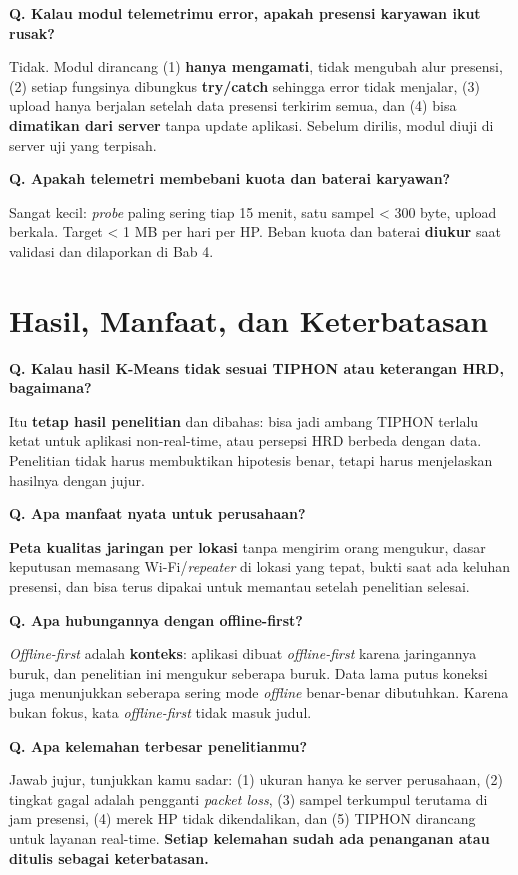 \documentclass[11pt,a4paper]{article}
\newcounter{q}
\newcommand{\tanya}[2]{\stepcounter{q}%
\par\vspace{6pt}\noindent\colorbox{band}{\parbox{\dimexpr\linewidth-2\fboxsep}{\textbf{Q\arabic{q}. #1}}}\par\vspace{2pt}#2\par}
\begin{document}
\tanya{Kalau modul telemetrimu error, apakah presensi karyawan ikut rusak?}{Tidak. Modul dirancang (1) \textbf{hanya mengamati}, tidak mengubah alur presensi, (2) setiap fungsinya dibungkus \textbf{try/catch} sehingga error tidak menjalar, (3) upload hanya berjalan setelah data presensi terkirim semua, dan (4) bisa \textbf{dimatikan dari server} tanpa update aplikasi. Sebelum dirilis, modul diuji di server uji yang terpisah.}

\tanya{Apakah telemetri membebani kuota dan baterai karyawan?}{Sangat kecil: \textit{probe} paling sering tiap 15 menit, satu sampel < 300 byte, upload berkala. Target < 1 MB per hari per HP. Beban kuota dan baterai \textbf{diukur} saat validasi dan dilaporkan di Bab 4.}

\section{Hasil, Manfaat, dan Keterbatasan}

\tanya{Kalau hasil K-Means tidak sesuai TIPHON atau keterangan HRD, bagaimana?}{Itu \textbf{tetap hasil penelitian} dan dibahas: bisa jadi ambang TIPHON terlalu ketat untuk aplikasi non-real-time, atau persepsi HRD berbeda dengan data. Penelitian tidak harus membuktikan hipotesis benar, tetapi harus menjelaskan hasilnya dengan jujur.}

\tanya{Apa manfaat nyata untuk perusahaan?}{\textbf{Peta kualitas jaringan per lokasi} tanpa mengirim orang mengukur, dasar keputusan memasang Wi-Fi/\textit{repeater} di lokasi yang tepat, bukti saat ada keluhan presensi, dan bisa terus dipakai untuk memantau setelah penelitian selesai.}

\tanya{Apa hubungannya dengan offline-first?}{\textit{Offline-first} adalah \textbf{konteks}: aplikasi dibuat \textit{offline-first} karena jaringannya buruk, dan penelitian ini mengukur seberapa buruk. Data lama putus koneksi juga menunjukkan seberapa sering mode \textit{offline} benar-benar dibutuhkan. Karena bukan fokus, kata \textit{offline-first} tidak masuk judul.}

\tanya{Apa kelemahan terbesar penelitianmu?}{Jawab jujur, tunjukkan kamu sadar: (1) ukuran hanya ke server perusahaan, (2) tingkat gagal adalah pengganti \textit{packet loss}, (3) sampel terkumpul terutama di jam presensi, (4) merek HP tidak dikendalikan, dan (5) TIPHON dirancang untuk layanan real-time. \textbf{Setiap kelemahan sudah ada penanganan atau ditulis sebagai keterbatasan.}}
\end{document}
